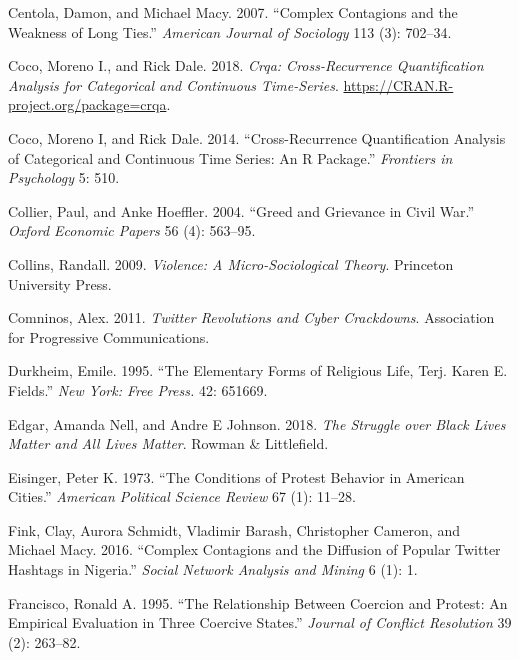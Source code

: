 \documentclass[
  english,
  man]{apa6}
\begin{document}
\leavevmode\hypertarget{ref-centola2007complex}{}%
Centola, Damon, and Michael Macy. 2007. ``Complex Contagions and the Weakness of Long Ties.'' \emph{American Journal of Sociology} 113 (3): 702--34.

\leavevmode\hypertarget{ref-R-crqa}{}%
Coco, Moreno I., and Rick Dale. 2018. \emph{Crqa: Cross-Recurrence Quantification Analysis for Categorical and Continuous Time-Series}. \url{https://CRAN.R-project.org/package=crqa}.

\leavevmode\hypertarget{ref-coco2014cross}{}%
Coco, Moreno I, and Rick Dale. 2014. ``Cross-Recurrence Quantification Analysis of Categorical and Continuous Time Series: An R Package.'' \emph{Frontiers in Psychology} 5: 510.

\leavevmode\hypertarget{ref-collier2004greed}{}%
Collier, Paul, and Anke Hoeffler. 2004. ``Greed and Grievance in Civil War.'' \emph{Oxford Economic Papers} 56 (4): 563--95.

\leavevmode\hypertarget{ref-collins2009violence}{}%
Collins, Randall. 2009. \emph{Violence: A Micro-Sociological Theory}. Princeton University Press.

\leavevmode\hypertarget{ref-comninos2011twitter}{}%
Comninos, Alex. 2011. \emph{Twitter Revolutions and Cyber Crackdowns}. Association for Progressive Communications.

\leavevmode\hypertarget{ref-durkheim1995elementary}{}%
Durkheim, Emile. 1995. ``The Elementary Forms of Religious Life, Terj. Karen E. Fields.'' \emph{New York: Free Press.} 42: 651669.

\leavevmode\hypertarget{ref-edgar2018struggle}{}%
Edgar, Amanda Nell, and Andre E Johnson. 2018. \emph{The Struggle over Black Lives Matter and All Lives Matter}. Rowman \& Littlefield.

\leavevmode\hypertarget{ref-eisinger1973conditions}{}%
Eisinger, Peter K. 1973. ``The Conditions of Protest Behavior in American Cities.'' \emph{American Political Science Review} 67 (1): 11--28.

\leavevmode\hypertarget{ref-fink2016complex}{}%
Fink, Clay, Aurora Schmidt, Vladimir Barash, Christopher Cameron, and Michael Macy. 2016. ``Complex Contagions and the Diffusion of Popular Twitter Hashtags in Nigeria.'' \emph{Social Network Analysis and Mining} 6 (1): 1.

\leavevmode\hypertarget{ref-francisco1995relationship}{}%
Francisco, Ronald A. 1995. ``The Relationship Between Coercion and Protest: An Empirical Evaluation in Three Coercive States.'' \emph{Journal of Conflict Resolution} 39 (2): 263--82.
\end{document}
